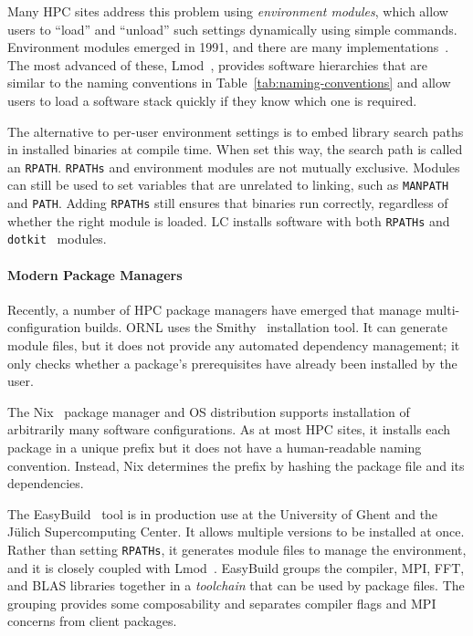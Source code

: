 Many HPC sites address this problem using {\it environment modules}, which
allow users to ``load'' and ``unload'' such settings dynamically using simple
commands. Environment modules emerged in 1991, and there are many implementations~\cite{dotkit,furlani+:lisa91,furlani+:lisa96,mclay:lmod,mclay:lmod-tutorial}.
The most advanced of these, Lmod~\cite{mclay:lmod,mclay:lmod-tutorial},
provides software hierarchies that are similar to the naming conventions in
Table~\ref{tab:naming-conventions} and allow users to load a software stack
quickly if they know which one is required.

The alternative to per-user environment settings is to embed library search
paths in installed binaries at compile time. When set this way, the search
path is called an {\tt RPATH}. {\tt RPATHs} and environment modules are not
mutually exclusive. Modules can still be used to set variables that are
unrelated to linking, such as {\tt MANPATH} and {\tt PATH}.  Adding
{\tt RPATHs} still ensures that binaries run correctly,
regardless of whether the right module is loaded. LC installs software with
both {\tt RPATHs} and {\tt dotkit}~\cite{dotkit} modules.

\paragraph{Modern Package Managers}

Recently, a number of HPC package managers have emerged that manage
multi-configuration builds.
%
ORNL uses the Smithy~\cite{digirolamo:smithy} installation tool. It
can generate module files, but it does not provide any
automated dependency management; it only checks whether a package's
prerequisites have already been installed by the user.

The Nix~\cite{dolstra+:icfp08,dolstra+:lisa04} package manager and OS
distribution supports installation of arbitrarily many software
configurations.  As at most HPC sites, it installs each package
in a unique prefix but it does not have a human-readable naming
convention.  Instead, Nix determines the prefix by hashing the package
file and its dependencies.

The EasyBuild~\cite{hoste+:pyhpc12} tool is in production use at
the University of Ghent and the J\"ulich Supercomputing Center.
It allows multiple versions to be installed at once.  Rather
than setting {\tt RPATHs}, it generates module files
to manage the environment, and it is closely coupled with
Lmod~\cite{geimer+:hust14}.  EasyBuild groups the compiler, MPI, FFT, and
BLAS libraries together in a {\it toolchain} that can be used by
package files. The grouping provides some composability and
separates compiler flags and MPI concerns from client packages.

